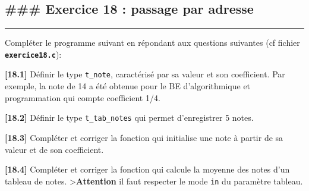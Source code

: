 \documentclass[11pt]{article}
\begin{document}
\hypertarget{exercice-18-passage-par-adresse}{%
\subsection{\#\#\# Exercice 18 : passage par
adresse}\label{exercice-18-passage-par-adresse}}

\begin{center}\rule{0.5\linewidth}{0.5pt}\end{center}

Compléter le programme suivant en répondant aux questions suivantes (cf
fichier \textbf{\texttt{exercice18.c}}):

\textbf{{[}18.1{]}} Définir le type \texttt{t\_note}, caractérisé par sa
valeur et son coefficient. Par exemple, la note de 14 a été obtenue pour
le BE d'algorithmique et programmation qui compte coefficient 1/4.

\textbf{{[}18.2{]}} Définir le type \texttt{t\_tab\_notes} qui permet
d'enregistrer 5 notes.

\textbf{{[}18.3{]}} Compléter et corriger la fonction qui initialise une
note à partir de sa valeur et de son coefficient.

\textbf{{[}18.4{]}} Compléter et corriger la fonction qui calcule la
moyenne des notes d'un tableau de notes.
\textgreater{}\textbf{Attention} il faut respecter le mode \texttt{in}
du paramètre tableau.
\end{document}
